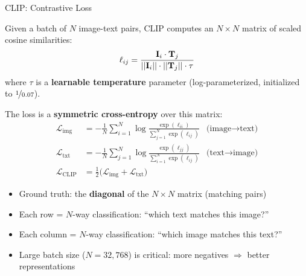\begin{frame}{CLIP: Contrastive Loss}

  Given a batch of $N$ image-text pairs, CLIP computes an $N \times N$ matrix of scaled cosine similarities:
  \[
      \ell_{ij} = \frac{\mathbf{I}_i \cdot \mathbf{T}_j}{||\mathbf{I}_i|| \cdot ||\mathbf{T}_j|| \cdot \tau}
  \]
  where $\tau$ is a \textbf{learnable temperature} parameter (log-parameterized, initialized to $\nicefrac{1}{0.07}$).

  \vspace{0.3em}
  The loss is a \textbf{symmetric cross-entropy} over this matrix:
  \begin{align*}
    \mathcal{L}_{\text{img}} &= -\frac{1}{N} \sum_{i=1}^{N} \log \frac{\exp(\ell_{ii})}{\sum_{j=1}^{N} \exp(\ell_{ij})}
    & \text{(image} \to \text{text)} \\[4pt]
    \mathcal{L}_{\text{txt}} &= -\frac{1}{N} \sum_{j=1}^{N} \log \frac{\exp(\ell_{jj})}{\sum_{i=1}^{N} \exp(\ell_{ij})}
    & \text{(text} \to \text{image)} \\[4pt]
    \mathcal{L}_{\text{CLIP}} &= \tfrac{1}{2}\bigl(\mathcal{L}_{\text{img}} + \mathcal{L}_{\text{txt}}\bigr)
  \end{align*}

  \begin{itemize}
    \item Ground truth: the \textbf{diagonal} of the $N \times N$ matrix (matching pairs)
    \item Each row = $N$-way classification: ``which text matches this image?''
    \item Each column = $N$-way classification: ``which image matches this text?''
    \item Large batch size ($N = 32{,}768$) is critical: more negatives $\Rightarrow$ better representations
  \end{itemize}
\end{frame}

